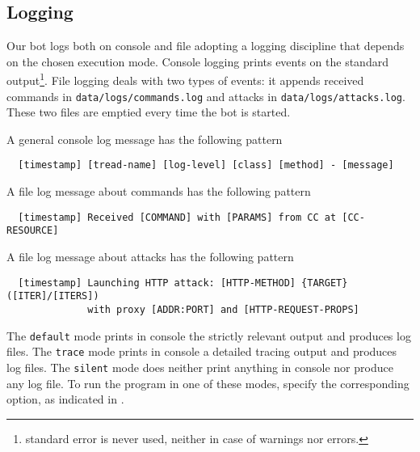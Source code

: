 \subsection{Logging}
\label{sec:logging}

Our bot logs both on console and file adopting a logging discipline that depends on the chosen execution mode.
Console logging prints events on the standard output\footnote{standard error is never used, neither in case of warnings nor errors.}.
File logging deals with two types of events: it appends received commands in \texttt{data/logs/commands.log} and attacks in \texttt{data/logs/attacks.log}. These two files are emptied every time the bot is started.

A general console log message has the following pattern

\begin{verbatim}
  [timestamp] [tread-name] [log-level] [class] [method] - [message]
\end{verbatim}

A file log message about commands has the following pattern

\begin{verbatim}
  [timestamp] Received [COMMAND] with [PARAMS] from CC at [CC-RESOURCE]
\end{verbatim}

A file log message about attacks has the following pattern

\begin{verbatim}
  [timestamp] Launching HTTP attack: [HTTP-METHOD] {TARGET} ([ITER]/[ITERS])
              with proxy [ADDR:PORT] and [HTTP-REQUEST-PROPS]
\end{verbatim}


The \texttt{default} mode prints in console the strictly relevant output and produces log files. The \texttt{trace} mode prints in console a detailed tracing output and produces log files. The \texttt{silent} mode does neither print anything in console nor produce any log file.
To run the program in one of these modes, specify the corresponding option, as indicated in .
